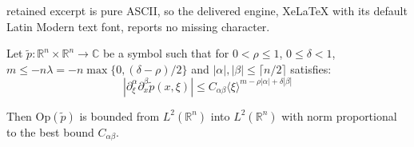\documentclass[10pt,a4paper]{amsart}
\begin{document}
retained excerpt is pure ASCII, so the delivered engine, XeLaTeX with its default Latin Modern text font, reports no missing character.
\begin{theorem}
    Let $\tilde{p}:\mathbb{R}^n \times \mathbb{R}^n \rightarrow \mathbb{C}$ be a symbol such that for $0<\rho\leq1$, $0\leq \delta < 1$, $m\leq -n \lambda = -n\max\{0, (\delta - \rho)/2\}$ and $|\alpha|,|\beta| \leq \lceil n/2\rceil$ satisfies: 
    \begin{equation}
        \left|\partial^\alpha_\xi \partial^\beta_x \tilde{p}(x, \xi)\right| \leq C_{\alpha\beta}\langle\xi\rangle^{m-\rho|\alpha| + \delta|\beta|}
    \end{equation}

    Then $\mathrm{Op}(\tilde{p})$ is bounded from $L^2(\mathbb{R}^n)$ into $L^2(\mathbb{R}^n)$ with norm proportional to the best bound $C_{\alpha\beta}$.
    \label{theo:22boundR}
\end{theorem}
\end{document}

